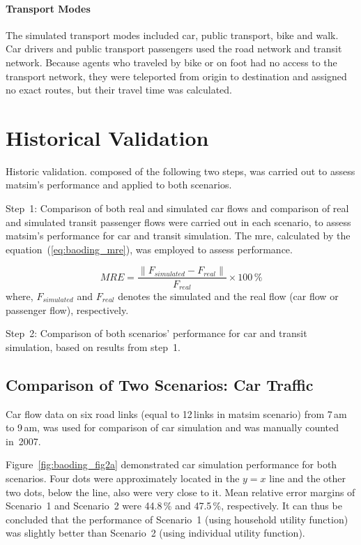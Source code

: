 \paragraph{Transport Modes} The simulated transport modes included car, public transport, bike and walk. Car drivers and public transport passengers used the road network and transit network. Because agents who traveled by bike or on foot had no access to the transport network, they were teleported from origin to destination and assigned no exact routes, but their travel time was calculated. 

\section{Historical Validation}
Historic validation. composed of the following two steps, was carried out to assess \gls{matsim}'s performance and applied to both scenarios. 

Step~1: Comparison of both real and simulated car flows and comparison of real and simulated transit passenger flows were carried out in each scenario, to assess  \gls{matsim}'s performance for car and transit simulation. 
The \gls{mre},  calculated by the equation~(\ref{eq:baoding_mre}), was employed to assess performance.

\begin{equation}
\label{eq:baoding_mre}
MRE = \frac{\lVert F_{simulated} - F_{real} \lVert}{F_{real}} \times 100\,\%
\end{equation} 
where, $F_{simulated}$ and $F_{real}$ denotes the simulated and the real flow (car flow or passenger flow), respectively.

Step~2: Comparison of both scenarios' performance for car and transit simulation, based on results from step~1. 

\subsection{Comparison of Two Scenarios: Car Traffic}
Car flow data on six road links (equal to 12\,links in \gls{matsim} scenario) from 7\,am to 9\,am, was used for comparison of car simulation and was manually counted in~2007. 

Figure~\ref{fig:baoding_fig2a} demonstrated car simulation performance for both scenarios. 
Four dots were approximately located in the $y=x$ line and the other two dots, below the line, also were very close to it. 
Mean relative error margins of Scenario~1 and Scenario~2 were 44.8\,\% and 47.5\,\%, respectively. 
It can thus be concluded that the performance of Scenario~1 (using  household utility function) was slightly better than Scenario~2 (using individual utility function). 

